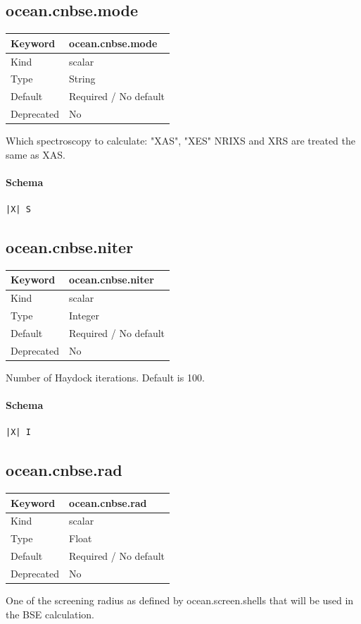 \documentclass[11pt]{article}
\begin{document}
{{{{{\subsection{ocean.cnbse.mode}
\label{kw:ocean-cnbse-mode}
\begin{longtable}{|p{1.5in}|p{4.5in}|}
\hline
Keyword & ocean.cnbse.mode \\
\hline
Kind & scalar \\
\hline
Type & String \\
\hline
Default & Required / No default \\
\hline
Deprecated & No \\
\hline
\end{longtable}
 Which spectroscopy to calculate: "XAS", "XES"
 NRIXS and XRS are treated the same as XAS.

\paragraph{Schema}
\begin{Verbatim}
|X| S
\end{Verbatim}

\subsection{ocean.cnbse.niter}
\label{kw:ocean-cnbse-niter}
\begin{longtable}{|p{1.5in}|p{4.5in}|}
\hline
Keyword & ocean.cnbse.niter \\
\hline
Kind & scalar \\
\hline
Type & Integer \\
\hline
Default & Required / No default \\
\hline
Deprecated & No \\
\hline
\end{longtable}
 Number of Haydock iterations. Default is 100.

\paragraph{Schema}
\begin{Verbatim}
|X| I
\end{Verbatim}

\subsection{ocean.cnbse.rad}
\label{kw:ocean-cnbse-rad}
\begin{longtable}{|p{1.5in}|p{4.5in}|}
\hline
Keyword & ocean.cnbse.rad \\
\hline
Kind & scalar \\
\hline
Type & Float \\
\hline
Default & Required / No default \\
\hline
Deprecated & No \\
\hline
\end{longtable}
 One of the screening radius as defined by ocean.screen.shells that will be
 used in the BSE calculation.

}}}}}
\end{document}
